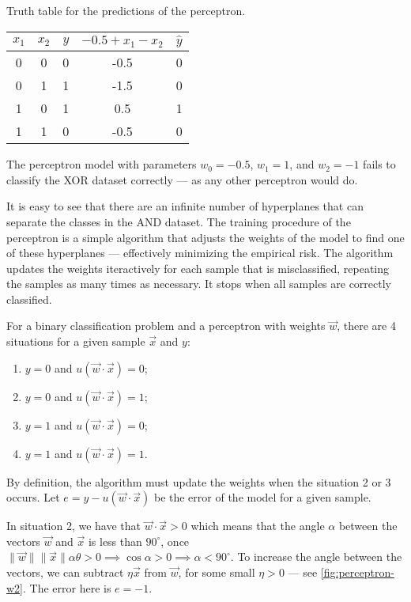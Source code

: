 \begin{tablebox}[label=tab:xor-perceptron]{Truth table for the predictions of the perceptron.}
  \centering
  \begin{tabular}{ccc|cc}
    \toprule
    $x_1$ & $x_2$ & $y$ & $-0.5 + x_1 - x_2$ & $\hat{y}$ \\
    \midrule
    0 & 0 & 0 & -0.5 & 0 \\
    0 & 1 & 1 & -1.5 & 0 \\
    1 & 0 & 1 & 0.5 & 1 \\
    1 & 1 & 0 & -0.5 & 0 \\
    \bottomrule
  \end{tabular}
  \tcblower
  The perceptron model with parameters $w_0 = -0.5$, $w_1 = 1$, and $w_2 = -1$
  fails to classify the XOR dataset correctly --- as any other perceptron would do.
\end{tablebox}

It is easy to see that there are an infinite number of hyperplanes that can separate the
classes in the AND dataset.  The training procedure of the perceptron is a simple
algorithm that adjusts the weights of the model to find one of these hyperplanes ---
effectively minimizing the empirical risk.  The algorithm updates the weights iteractively
for each sample that is misclassified, repeating the samples as many times as necessary.
It stops when all samples are correctly classified.

For a binary classification problem and a perceptron with weights $\vec{w}$, there are 4
situations for a given sample $\vec{x}$ and $y$:
\begin{enumerate}
  \itemsep0em
  \item $y = 0$ and $u(\vec{w} \cdot \vec{x})= 0$;
  \item $y = 0$ and $u(\vec{w} \cdot \vec{x})= 1$;
  \item $y = 1$ and $u(\vec{w} \cdot \vec{x})= 0$;
  \item $y = 1$ and $u(\vec{w} \cdot \vec{x})= 1$.
\end{enumerate}

By definition, the algorithm must update the weights when the situation 2 or 3 occurs.
Let $e = y - u(\vec{w} \cdot \vec{x})$ be the error of the model for a given sample.

In situation 2, we have that $\vec{w} \cdot \vec{x} > 0$ which means that the angle
$\alpha$ between the vectors $\vec{w}$ and $\vec{x}$ is less than $90^\circ$, once
$\|\vec{w}\|\|\vec{x}\|\alpha\theta > 0 \implies \cos\alpha > 0 \implies \alpha <
90^\circ$.  To increase the angle between the vectors, we can subtract $\eta\vec{x}$ from
$\vec{w}$, for some small $\eta > 0$ --- see \cref{fig:perceptron-w2}.  The error
here is $e = -1$.

